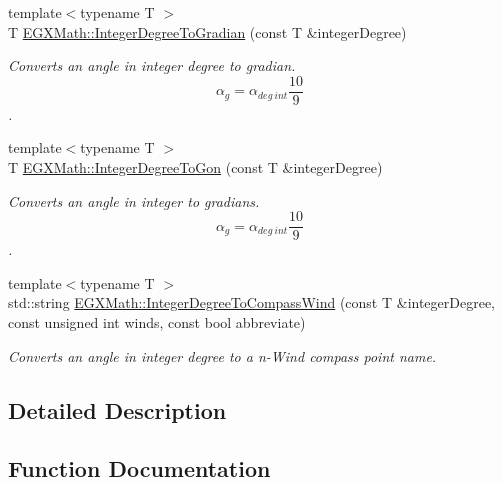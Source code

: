 \begin{DoxyCompactItemize}
{\footnotesize template$<$typename T $>$ }\\T \mbox{\hyperlink{group___e_g_x_math-_angle_conversions-_integer_degree_ga47127467ff7a8ef57f6be9ce496a97df}{E\+G\+X\+Math\+::\+Integer\+Degree\+To\+Gradian}} (const T \&integer\+Degree)
\begin{DoxyCompactList}\small\item\em Converts an angle in integer degree to gradian. \[\alpha_{g}=\alpha_{deg\ int}\frac{10}{9}\]. \end{DoxyCompactList}\item 
{\footnotesize template$<$typename T $>$ }\\T \mbox{\hyperlink{group___e_g_x_math-_angle_conversions-_integer_degree_ga6e5be425c37ad27319f09329156c64bb}{E\+G\+X\+Math\+::\+Integer\+Degree\+To\+Gon}} (const T \&integer\+Degree)
\begin{DoxyCompactList}\small\item\em Converts an angle in integer to gradians. \[\alpha_{g}=\alpha_{deg\ int}\frac{10}{9}\]. \end{DoxyCompactList}\item 
{\footnotesize template$<$typename T $>$ }\\std\+::string \mbox{\hyperlink{group___e_g_x_math-_angle_conversions-_integer_degree_ga01abeefd29282a3c88d3d3c28fd2c6fa}{E\+G\+X\+Math\+::\+Integer\+Degree\+To\+Compass\+Wind}} (const T \&integer\+Degree, const unsigned int winds, const bool abbreviate)
\begin{DoxyCompactList}\small\item\em Converts an angle in integer degree to a n-\/\+Wind compass point name. \end{DoxyCompactList}\end{DoxyCompactItemize}


\subsection{Detailed Description}


\subsection{Function Documentation}
\mbox{\label{group___e_g_x_math-_angle_conversions-_integer_degree_gaf633d0b82bfb7586ce86ffbcf78d8f7a}} 
